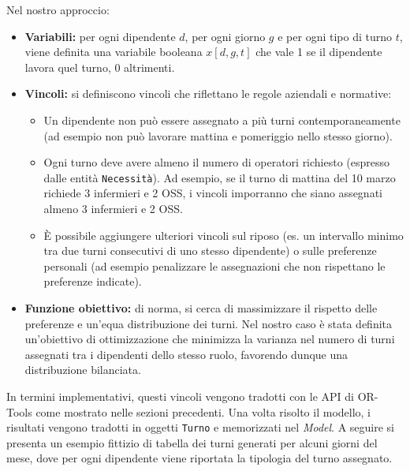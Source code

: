 \documentclass[a4paper,12pt]{report}
\begin{document}
Nel nostro approccio:
\begin{itemize}
    \item \textbf{Variabili:} per ogni dipendente $d$, per ogni giorno $g$ e per ogni tipo di turno $t$, viene definita una variabile booleana $x[d,g,t]$ che vale 1 se il dipendente lavora quel turno, 0 altrimenti.
    \item \textbf{Vincoli:} si definiscono vincoli che riflettano le regole aziendali e normative:
        \begin{itemize}
            \item Un dipendente non pu\`o essere assegnato a pi\`u turni contemporaneamente (ad esempio non pu\`o lavorare mattina e pomeriggio nello stesso giorno).
            \item Ogni turno deve avere almeno il numero di operatori richiesto (espresso dalle entit\`a \texttt{Necessit\`a}). Ad esempio, se il turno di mattina del 10 marzo richiede 3 infermieri e 2 OSS, i vincoli imporranno che siano assegnati almeno 3 infermieri e 2 OSS.
            \item \`E possibile aggiungere ulteriori vincoli sul riposo (es. un intervallo minimo tra due turni consecutivi di uno stesso dipendente) o sulle preferenze personali (ad esempio penalizzare le assegnazioni che non rispettano le preferenze indicate).
        \end{itemize}
    \item \textbf{Funzione obiettivo:} di norma, si cerca di massimizzare il rispetto delle preferenze e un'equa distribuzione dei turni. Nel nostro caso \`e stata definita un'obiettivo di ottimizzazione che minimizza la varianza nel numero di turni assegnati tra i dipendenti dello stesso ruolo, favorendo dunque una distribuzione bilanciata.
\end{itemize}

In termini implementativi, questi vincoli vengono tradotti con le API di OR-Tools come mostrato nelle sezioni precedenti. Una volta risolto il modello, i risultati vengono tradotti in oggetti \texttt{Turno} e memorizzati nel \emph{Model}. A seguire si presenta un esempio fittizio di tabella dei turni generati per alcuni giorni del mese, dove per ogni dipendente viene riportata la tipologia del turno assegnato.
\end{document}

